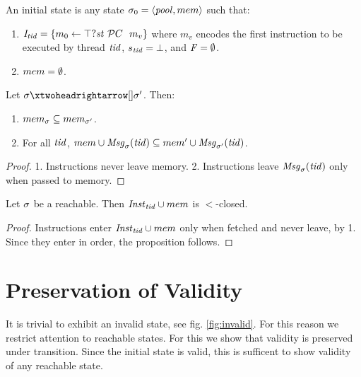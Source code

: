 %
\begin{definition}
An initial state is any state $\sigma_0 = \langle \mathit{pool},mem\rangle$ such that:
\begin{enumerate}
\item $\mathit{I}_{\mathit{tid}}=\{m_0 \leftarrow \top ? \mathit{st}\ \mathcal PC\ \ m_v \}$ where $m_v$ encodes the first instruction to be executed by thread $\mathit{tid}$, $s_{\mathit{tid}} = \bot$, and $\mathit{F} = \emptyset$.
\item $mem = \emptyset$.
\end{enumerate}
\end{definition}
%

\begin{proposition}
\label{prop:storeMonotonicity}
Let $\state\doublestep{}{}\state'$. Then:
\begin{enumerate}
\item $mem_{\sigma}\subseteq mem_{\sigma'}$.
\item For all $\mathit{tid}$, $mem\cup\mathit{Msg}_\sigma(\mathit{tid})\subseteq mem'\cup\mathit{Msg}_{\sigma'}(\mathit{tid})$.
\end{enumerate}
\end{proposition}
\begin{proof}
1. Instructions never leave memory. 2. Instructions leave $\mathit{Msg}_{\sigma}(\mathit{tid})$ only when passed to memory. 
\end{proof}

\begin{proposition}
\label{prop: downwardsClosure}
Let $\sigma$ be a reachable. Then $\mathit{Inst}_{\mathit{tid}}\cup mem$ is $<$-closed.
\end{proposition}
\begin{proof}
Instructions enter $\mathit{Inst}_{\mathit{tid}}\cup mem$ only when fetched and never leave, by 1. Since they enter in order, the proposition follows.
\end{proof}


\section{Preservation of Validity}


It is trivial to exhibit an invalid state, see fig. \ref{fig:invalid}. For this reason we  restrict attention to reachable states. For this we show that
validity is preserved under transition. Since the initial state is valid, this is sufficent to show validity of any reachable state.

